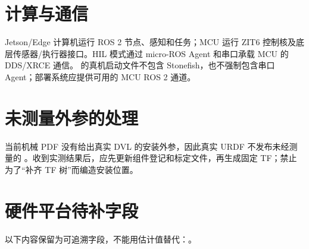 \section{计算与通信}
Jetson/Edge 计算机运行 ROS 2 节点、感知和任务；MCU 运行 ZIT6 控制核及底层传感器/执行器接口。HIL 模式通过 micro-ROS Agent 和串口承载 MCU 的 DDS/XRCE 通信。 的真机启动文件不包含 Stonefish，也不强制包含串口 Agent；部署系统应提供可用的 MCU ROS 2 通道。

\section{未测量外参的处理}
当前机械 PDF 没有给出真实 DVL 的安装外参，因此真实 URDF 不发布未经测量的 。收到实测结果后，应先更新组件登记和标定文件，再生成固定 TF；禁止为了“补齐 TF 树”而编造安装位置。

\section{硬件平台待补字段}
以下内容保留为可追溯字段，不能用估计值替代：。
